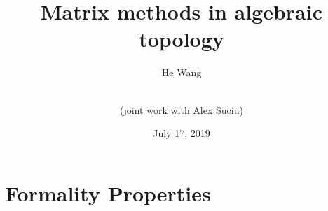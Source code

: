 \documentclass[dvipsnames]{beamer}
\title[\scalebox{.88}{Matrix methods in algebraic topology}]{Matrix methods in algebraic topology}
\author[He Wang]{ \large He Wang   \and \\  \small (joint work with Alex Suciu)}
\institute[UNR ] %
{\Large
  \inst{University\, of\, Nevada,\, Reno }
  \and
  \inst{ }
  {  \\  \small
The 8th International Conference on Matrix Analysis and Applications\\ 
 (ICMAA 2019) \\
\small University of Nevada, Reno
   }}
\date{ \scalebox{.88} {July 17, 2019}}
\theoremstyle{example}
\begin{document}

\begin{frame} 
\titlepage 
\end{frame}






\section{Formality Properties}  
\end{document}

